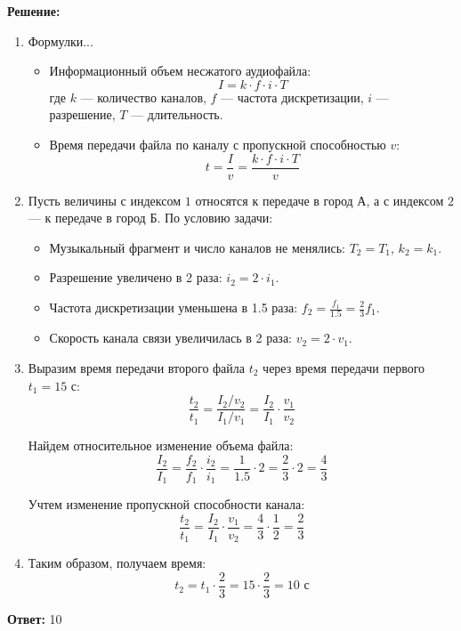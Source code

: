 \documentclass[11pt,a4paper]{article}
\begin{document}
\textbf{Решение:}
\begin{enumerate}
    \item Формулки...
    \begin{itemize}
        \item Информационный объем несжатого аудиофайла:
        $$I = k \cdot f \cdot i \cdot T$$
        где $k$ --- количество каналов, $f$ --- частота дискретизации, $i$ --- разрешение, $T$ --- длительность.
        \item Время передачи файла по каналу с пропускной способностью $v$:
        $$t = \frac{I}{v} = \frac{k \cdot f \cdot i \cdot T}{v}$$
    \end{itemize}

    \item
    Пусть величины с индексом $1$ относятся к передаче в город А, а с индексом $2$ --- к передаче в город Б.
    По условию задачи:
    \begin{itemize}
        \item Музыкальный фрагмент и число каналов не менялись: $T_2 = T_1$, $k_2 = k_1$.
        \item Разрешение увеличено в 2 раза: $i_2 = 2 \cdot i_1$.
        \item Частота дискретизации уменьшена в 1.5 раза: $f_2 = \frac{f_1}{1.5} = \frac{2}{3} f_1$.
        \item Скорость канала связи увеличилась в 2 раза: $v_2 = 2 \cdot v_1$.
    \end{itemize}

    \item Выразим время передачи второго файла $t_2$ через время передачи первого $t_1 = 15\text{ с}$:
    $$\frac{t_2}{t_1} = \frac{I_2 / v_2}{I_1 / v_1} = \frac{I_2}{I_1} \cdot \frac{v_1}{v_2}$$
    
    Найдем относительное изменение объема файла:
    $$\frac{I_2}{I_1} = \frac{f_2}{f_1} \cdot \frac{i_2}{i_1} = \frac{1}{1.5} \cdot 2 = \frac{2}{3} \cdot 2 = \frac{4}{3}$$

    Учтем изменение пропускной способности канала:
    $$\frac{t_2}{t_1} = \frac{I_2}{I_1} \cdot \frac{v_1}{v_2} = \frac{4}{3} \cdot \frac{1}{2} = \frac{2}{3}$$

    \item Таким образом, получаем время:
    $$t_2 = t_1 \cdot \frac{2}{3} = 15 \cdot \frac{2}{3} = 10 \text{ с}$$
\end{enumerate}
\textbf{Ответ:} 10
\end{document}
